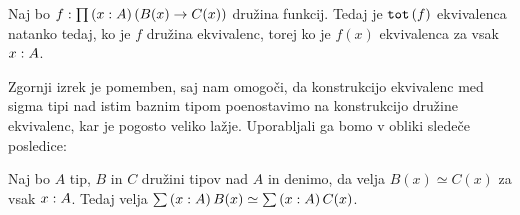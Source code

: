 \begin{comment}
\begin{definicija}
  Naj bo \(\defun{f}{A}{B}\) funkcija in \(\typejudgment{b}{B}\). Tip
  \[\fib{f}{b} := \sumtype{x}{A}{f(x) = b}\]
  imenujemo \emph{vlakno funkcije f pri točki b}.
\end{definicija}

\begin{trditev}
  Funkcija \(f\) je obrnljiva natanko tedaj, ko je vlakno funkcije \(f\) pri \(y\)
  kontraktibilno za vsak \(\typejudgment{y}{B}\).
\end{trditev}

\begin{dokaz}
  Denimo najprej, da je funkcija \(\defun{f}{A}{B}\) obrnljiva in naj bo
  \(\typejudgment{y}{B}\). Dokazati želimo, da je tip
  \(\fib{f}{y} = \sumtype{x}{A}{fx = y}\)
  kontraktibilen. Ker je funkcija \(f\) obrnljiva, obstaja funkcija \(\defun{g}{B}{A}\)
  in homotopija \(\homotopy{H}{f \circ g}{id}\), zato lahko za center kontrakcije
  tipa \(\fib{f}{y}\) izberemo element \(\left(g(y), H(y)\right)\). Da bi konstruirali
\end{dokaz}

\begin{definicija}
  Naj bo \(\typejudgment{f}{\pitype{x}{A}{\left(B(x) \to C(x)\right)}}\) družina funkcij.
  Definiramo (TODO prevedi total) funkcijo
  \(\typejudgment{\tot(f)}{\sumtype{x}{A}{Bx}} \to \sumtype{x}{A}{Cx}\) s predpisom
  \(\tot(f)(x, y) = (x, f(x, y))\).
\end{definicija}
\end{comment}


\begin{izrek}
  Naj bo \(f : \prod \left( x : A \right) \left(B(x) \to C(x)\right)\) družina funkcij.
  Tedaj je \(\textnormal{\texttt{tot}}\,(f)\) ekvivalenca natanko tedaj, ko je \(f\) družina ekvivalenc, torej
  ko je \(f(x)\) ekvivalenca za vsak \(x : A\).
\end{izrek}

Zgornji izrek je pomemben, saj nam omogoči, da konstrukcijo ekvivalenc med sigma tipi
nad istim baznim tipom poenostavimo na konstrukcijo družine ekvivalenc, kar je pogosto
veliko lažje. Uporabljali ga bomo v obliki sledeče posledice:

\begin{posledica}
  \label{equiv-tot}
  Naj bo \(A\) tip, \(B\) in \(C\) družini tipov nad \(A\) in denimo, da velja
  \(B(x) \simeq C(x)\) za vsak \(x : A\).
  Tedaj velja \(\sum \left( x : A \right) B(x) \simeq \sum \left( x : A \right) C(x)\).
\end{posledica}

